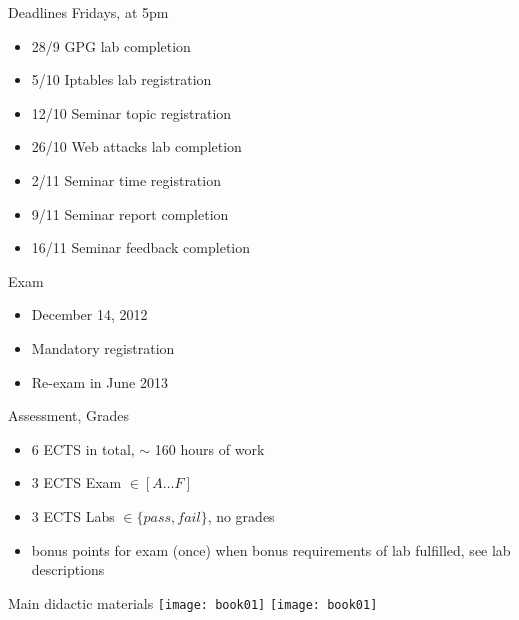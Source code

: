 \documentclass{beamer}
\begin{document}
\begin{frame}{Deadlines}
  Fridays, at 5pm 
  \begin{itemize}
  \item 28/9 GPG lab completion 
  \item 5/10 Iptables lab registration 
  \item 12/10 Seminar topic registration 
  \item 26/10 Web attacks lab completion 
  \item 2/11 Seminar time registration 
  \item 9/11 Seminar report completion 
  \item 16/11 Seminar feedback completion 
  \end{itemize}
\end{frame}

\begin{frame}{Exam}
  \begin{itemize}
  \item December 14, 2012
  \item \alert{Mandatory} registration 
  \item Re-exam in June 2013
  \end{itemize}
\end{frame}

\begin{frame}{Assessment, Grades}
  \begin{itemize}
  \item 6 ECTS in total, $\sim$ 160 hours of work 
  \item 3 ECTS Exam $\in [A \dots F]$
  \item 3 ECTS Labs $\in \{pass,fail\}$, no grades
  \item bonus points for exam (once) when bonus 
    requirements of lab fulfilled, see lab descriptions
  \end{itemize}
\end{frame}

\begin{frame}{Main didactic materials}
  \texttt{[image: book01]}
  \texttt{[image: book01]}
\end{frame}
\end{document}
